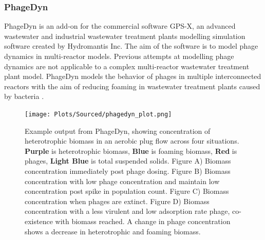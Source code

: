 \subsubsection{PhageDyn}
PhageDyn is an add-on for the commercial software GPS-X, an advanced wastewater and industrial wastewater treatment plants modelling simulation software created by Hydromantis Inc. 
The aim of the software is to model phage dynamics in multi-reactor models. 
Previous attempts at modelling phage dynamics are not applicable to a complex multi-reactor wastewater treatment plant model. 
PhageDyn models the behavior of phages in multiple interconnected reactors with the aim of reducing foaming in wastewater treatment plants caused by bacteria \cite{heardEffectFilamentousBacteria2008}. 
\begin{figure}
    \centering
    \texttt{[image: Plots/Sourced/phagedyn\_plot.png]}
    \caption{
        Example output from PhageDyn, showing concentration of heterotrophic biomass in an aerobic plug flow across four situations.
        \textcolor[HTML]{551A8C}{\textbf{Purple}} is heterotrophic biomass, 
        \textcolor[HTML]{4580B4}{\textbf{Blue}} is foaming biomass, 
        \textcolor[HTML]{FF0000}{\textbf{Red}} is phages, 
        \textcolor[HTML]{01E6EE}{\textbf{Light Blue}} is total suspended solids. 
        Figure A) Biomass concentration immediately post phage dosing.
        Figure B) Biomass concentration with low phage concentration and maintain low concentration post spike in population count. 
        Figure C) Biomass concentration when phages are extinct. 
        Figure D) Biomass concentration with a less virulent and low adsorption rate phage, co-existence with biomass reached. 
        A change in phage concentration shows a decrease in heterotrophic and foaming biomass. 
    }
    \label{fig:cocktail_software_output}
\end{figure}

\cite{krysiak-baltynSimulationPhageDynamics2017}